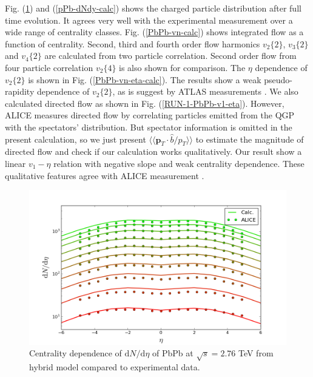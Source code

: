 \documentclass[aps,prl,twocolumn,groupedaddress]{revtex4-1}
\begin{document}
	Fig. (\ref{PbPb-dNdy-calc}) and  (\ref{pPb-dNdy-calc}) shows the charged particle distribution after full time evolution. 
	It agrees very well with the experimental measurement over a wide range of centrality classes. 
	Fig. (\ref{PbPb-vn-calc}) shows integrated flow as a function of centrality. 
	Second, third and fourth order flow harmonics $v_2\{2\}$, $v_3\{2\}$ and $v_4\{2\}$ are calculated from two particle correlation. Second order flow from four particle correlation $v_2\{4\}$ is also shown for comparison.
	The $\eta$ dependence of $v_2\{2\}$ is shown in Fig. (\ref{PbPb-vn-eta-calc}). The results show a weak pseudo-rapidity dependence of $v_2\{2\}$, as is suggest by ATLAS measurements \citep{ATLAS:2014eoa}.
	We also calculated directed flow as shown in Fig. (\ref{RUN-1-PbPb-v1-eta}). 
	However, ALICE measures directed flow by correlating particles emitted from the QGP with the spectators' distribution.
	But spectator information is omitted in the present calculation, so we just present $\langle\langle \mathbf{p}_T\cdot \hat{b}/p_T\rangle\rangle$ to estimate the magnitude of directed flow and check if our calculation works qualitatively.
	Our result show a linear $v_1-\eta$ relation with negative slope and weak centrality dependence.
	These qualitative features agree with ALICE measurement \citep{Abelev:2013cva}.
	\begin{figure}
  	\centering
	\includegraphics[width=\columnwidth]{pics/RUN-1-PbPb-dNdy-eta.png}
  	\caption{Centrality dependence of $\mathrm{d}N/\mathrm{d}\eta$ of PbPb at $\sqrt{s} = 2.76$ TeV from hybrid model compared to experimental data.}
  	\label{PbPb-dNdy-calc}
	\end{figure}
	
\end{document}
